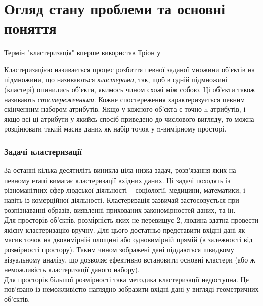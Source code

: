 \chapter{Огляд стану проблеми та основні поняття}\label{ch:01}

Термін "кластеризація" вперше використав Тріон у \cite{Tryon:Cluster:1939}

Кластеризацією називається процес розбиття певної заданої множини об'єктів на підмножини, що називаються \textit{кластерами}, так, щоб в одній підмножині (кластері) опинились об'єкти, якимось чином схожі між собою. Ці об'єкти також називають \textit{спостереженнями}.
Кожне спостереження характеризується певним скінченним набором атрибутів. Якщо у кожного об'єкта є точно n атрибутів, і якщо всі ці атрибути у якийсь спосіб приведено до числового вигляду, то можна розцінювати такий масив даних як набір точок у n-вимірному просторі.
\subsection{Задачі кластеризації}
За останні кілька десятиліть виникла ціла низка задач, розв'язання яких на певному етапі вимагає кластеризації вхідних даних. Ці задачі походять із різноманітних сфер людської діяльності -- соціології, медицини, математики, і навіть із комерційної діяльності. Кластеризація зазвичай застосовується при розпізнаванні образів, виявленні прихованих закономірностей даних, та ін. 
\\
Для просторів об'єктів, розмірність яких не перевищує 2, людина здатна провести якісну кластеризацію вручну. Для цього достатньо представити вхідні дані як масив точок на двовимірній площині або одновимірній прямій (в залежності від розмірності простору). Таким чином зображені дані піддаються швидкому візуальному аналізу, що дозволяє ефективно встановити основні кластери (або ж неможливість кластеризації даного набору).
\\
Для просторів більшої розмірності така методика кластеризації недоступна. Це пов'язано із неможливістю наглядно зобразити вхідні дані у вигляді геометричних об'єктів. 
